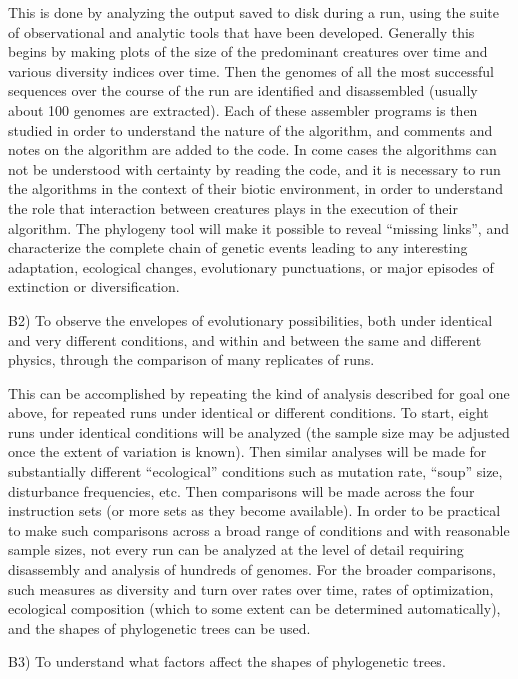 This is done by analyzing the output saved to disk during a run, using the
suite of observational and analytic tools that have been developed.  Generally
this begins by making plots of the size of the predominant creatures over
time and various diversity indices over time.  Then the genomes of all the
most successful sequences over the course of the run are identified and
disassembled (usually about 100 genomes are extracted).  Each of these
assembler programs is then studied in order to understand the nature of the
algorithm, and comments and notes on the algorithm are added to the code.  In
come cases the algorithms can not be understood with certainty by reading the
code, and it is necessary to run the algorithms in the context of their biotic
environment, in order to understand the role that interaction between
creatures plays in the execution of their algorithm.  The phylogeny tool will
make it possible to reveal ``missing links'', and characterize the complete
chain of genetic events leading to any interesting adaptation, ecological
changes, evolutionary punctuations, or major episodes of extinction or
diversification.

\XP
B2) To observe the envelopes of evolutionary possibilities, both under
identical and very different conditions, and within and between the same and
different physics, through the comparison of many replicates of runs.
\eXP

This can be accomplished by repeating the kind of analysis described for goal
one above, for repeated runs under identical or different conditions.  To
start, eight runs under identical conditions will be analyzed (the sample
size may be adjusted once the extent of variation is known).  Then similar
analyses will be made for substantially different ``ecological'' conditions
such as mutation rate, ``soup'' size, disturbance frequencies, etc.  Then
comparisons will be made across the four instruction sets (or more sets as
they become available).  In order to be practical to make such comparisons
across a broad range of conditions and with reasonable sample sizes, not
every run can be analyzed at the level of detail requiring disassembly and
analysis of hundreds of genomes.  For the broader comparisons, such measures
as diversity and turn over rates over time, rates of optimization, ecological
composition (which to some extent can be determined automatically), and the
shapes of phylogenetic trees can be used.

\XP
B3) To understand what factors affect the shapes of phylogenetic trees.
\eXP

